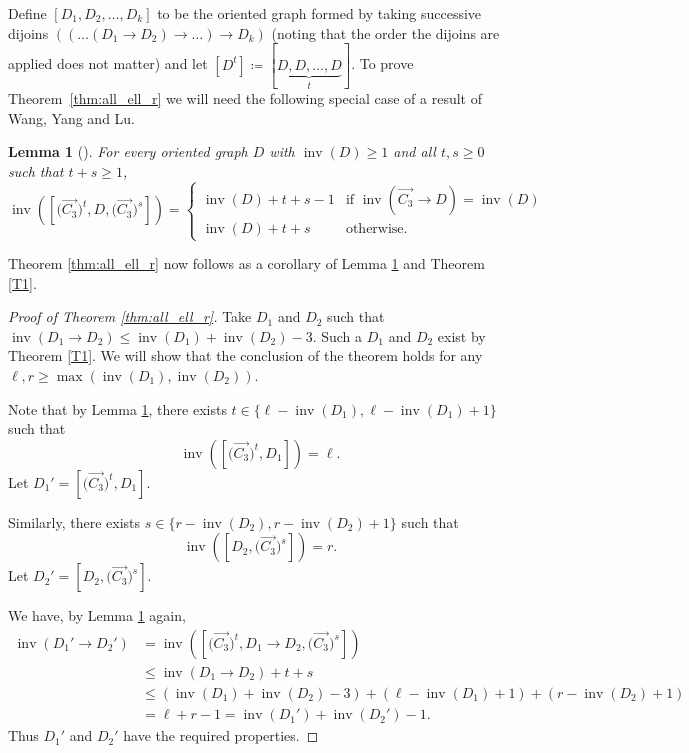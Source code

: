 \documentclass[a4paper, 12pt, reqno]{amsart}
\numberwithin{equation}{section}
\theoremstyle{plain}
\newtheorem{lemma}[thm]{Lemma}
\theoremstyle{remark}
\theoremstyle{definition}
\newcommand{\lb}{\left(}
\newcommand{\rb}{\right)}
\newcommand{\inv}{\operatorname{inv}}
\begin{document}
Define $[D_1,D_2,\ldots,D_k]$ to be the oriented graph formed by taking successive dijoins $((\ldots(D_1 \rightarrow D_2) \rightarrow \ldots )\rightarrow D_k)$ (noting that the order the dijoins are applied does not matter) and let $[D^t] \coloneqq [\underbrace{D,D,\ldots,D}_{t}]$.
To prove Theorem~\ref{thm:all_ell_r} we will need the following special case of a result of Wang, Yang and Lu.

\begin{lemma}[{\cite[Corollary 1.10]{Wang}}]\label{lem:C3_dijoins}
For every oriented graph $D$ with $\inv(D) \ge 1$ and all $t,s \ge 0$ such that $t+s\ge 1$,
\begin{equation*}
\inv\lb\left[\big(\overrightarrow{C_3}\big)^t,D,\big(\overrightarrow{C_3}\big)^s\right] \rb = \begin{cases} \inv(D) + t +s-1 &\text{if $\inv(\overrightarrow{C_3}\rightarrow D) = \inv(D)$}\\
\inv(D) + t+s &\text{otherwise.}
\end{cases} 
\end{equation*}
\end{lemma}

Theorem \ref{thm:all_ell_r} now follows as a corollary of Lemma \ref{lem:C3_dijoins} and Theorem \ref{T1}.

\begin{proof}[Proof of Theorem \ref{thm:all_ell_r}]
    Take $D_1$ and $D_2$ such that $\inv(D_1 \rightarrow D_2) \le \inv(D_1) + \inv(D_2) - 3$. Such a $D_1$ and $D_2$ exist by Theorem \ref{T1}. We will show that the conclusion of the theorem holds for any $\ell,r \ge \max\lb\inv(D_1),\inv(D_2)\rb$.
    
    Note that by Lemma \ref{lem:C3_dijoins}, there exists $t \in \{\ell - \inv(D_1), \ell - \inv(D_1)+1\}$ such that 
    \begin{equation*}
\inv\lb\left[\big(\overrightarrow{C_3}\big)^{t},D_1\right] \rb = \ell.
\end{equation*}
Let $D_1' = \left[\big(\overrightarrow{C_3}\big)^{t},D_1\right]$.

Similarly, there exists $s\in \{r - \inv(D_2), r - \inv(D_2)+1\}$ such that 
    \begin{equation*}
\inv\lb\left[D_2,\big(\overrightarrow{C_3}\big)^{s}\right] \rb = r.
\end{equation*}
Let $D_2' = \left[D_2,\big(\overrightarrow{C_3}\big)^{s}\right] $.

We have, by Lemma \ref{lem:C3_dijoins} again,
\begin{align*}
\inv(D_1'\rightarrow D_2') &= \inv\left(\left[\big(\overrightarrow{C_3}\big)^t,D_1\rightarrow D_2,\big(\overrightarrow{C_3}\big)^s\right] 
\right) \\
&\le \inv(D_1\rightarrow D_2) + t + s \\
&\le (\inv(D_1) + \inv(D_2)-3) + (\ell - \inv(D_1)+1) +  (r - \inv(D_2)+1) \\
& = \ell + r - 1 = \inv(D_1') + \inv(D_2') -1. 
\end{align*}
Thus $D_1'$ and $D_2'$ have the required properties.
\end{proof}
 
\end{document}
